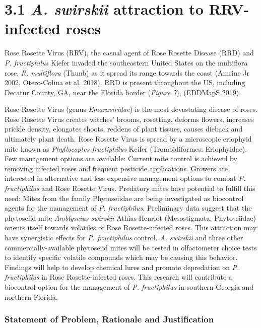 \documentclass[12pt,final,CPage]{ufthesis}
\begin{document}
{  \hypertarget{swirskii-roses}{%
  \section{\texorpdfstring{3.1 \emph{A. swirskii} attraction to RRV-infected roses}{3.1 A. swirskii attraction to RRV-infected roses}}\label{swirskii-roses}}

  Rose Rosette Virus (RRV), the casual agent of Rose Rosette Disease (RRD) and \emph{P. fructiphilus} Kiefer invaded the southeastern United States on the multiflora rose, \emph{R. multiflora} (Thunb) as it spread its range towards the coast (Amrine Jr 2002, Otero-Colina et al. 2018). RRD is present throughout the US, including Decatur County, GA, near the Florida border (\emph{Figure 7}), (EDDMapS 2019).

  Rose Rosette Virus (genus \emph{Emaraviridae}) is the most devastating disease of roses. Rose Rosette Virus creates witches' brooms, rosetting, deforms flowers, increases prickle density, elongates shoots, reddens of plant tissues, causes dieback and ultimately plant death. Rose Rosette Virus is spread by a microscopic eriophyid mite known as \emph{Phyllocoptes fructiphilus} Keifer (Trombidiformes: Eriophyidae). Few management options are available: Current mite control is achieved by removing infected roses and frequent pesticide applications. Growers are interested in alternative and less expensive management options to combat \emph{P. fructiphilus} and Rose Rosette Virus. Predatory mites have potential to fulfill this need: Mites from the family Phytoseiidae are being investigated as biocontrol agents for the management of \emph{P. fructiphilus}. Preliminary data suggest that the phytoseiid mite \emph{Amblyseius swirskii} Athias-Henriot (Mesostigmata: Phytoseiidae) orients itself towards volatiles of Rose Rosette-infected roses. This attraction may have synergistic effects for \emph{P. fructiphilus} control. \emph{A. swirskii} and three other commercially-available phytoseiid mites will be tested in olfactometer choice tests to identify specific volatile compounds which may be causing this behavior. Findings will help to develop chemical lures and promote depredation on \emph{P. fructiphilus} in Rose Rosette-infected roses. This research will contribute a biocontrol option for the management of \emph{P. fructiphilus} in southern Georgia and northern Florida.

  \hypertarget{statement-of-problem-rationale-and-justification}{%
  \subsubsection{Statement of Problem, Rationale and Justification}\label{statement-of-problem-rationale-and-justification}}

}
\end{document}
